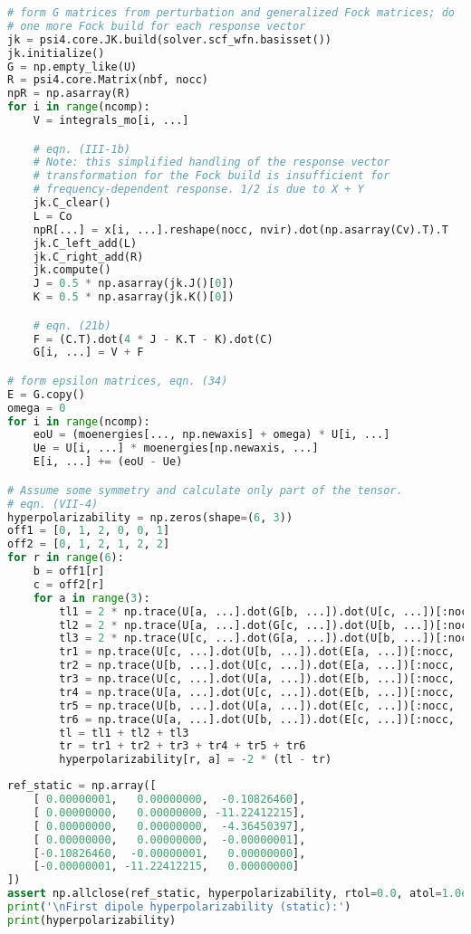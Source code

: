 \documentclass[]{article}
\begin{document}
\begin{lstlisting}[language=Python]
# form G matrices from perturbation and generalized Fock matrices; do
# one more Fock build for each response vector
jk = psi4.core.JK.build(solver.scf_wfn.basisset())
jk.initialize()
G = np.empty_like(U)
R = psi4.core.Matrix(nbf, nocc)
npR = np.asarray(R)
for i in range(ncomp):
    V = integrals_mo[i, ...]

    # eqn. (III-1b)
    # Note: this simplified handling of the response vector
    # transformation for the Fock build is insufficient for
    # frequency-dependent response. 1/2 is due to X + Y
    jk.C_clear()
    L = Co
    npR[...] = x[i, ...].reshape(nocc, nvir).dot(np.asarray(Cv).T).T
    jk.C_left_add(L)
    jk.C_right_add(R)
    jk.compute()
    J = 0.5 * np.asarray(jk.J()[0])
    K = 0.5 * np.asarray(jk.K()[0])

    # eqn. (21b)
    F = (C.T).dot(4 * J - K.T - K).dot(C)
    G[i, ...] = V + F

# form epsilon matrices, eqn. (34)
E = G.copy()
omega = 0
for i in range(ncomp):
    eoU = (moenergies[..., np.newaxis] + omega) * U[i, ...]
    Ue = U[i, ...] * moenergies[np.newaxis, ...]
    E[i, ...] += (eoU - Ue)

# Assume some symmetry and calculate only part of the tensor.
# eqn. (VII-4)
hyperpolarizability = np.zeros(shape=(6, 3))
off1 = [0, 1, 2, 0, 0, 1]
off2 = [0, 1, 2, 1, 2, 2]
for r in range(6):
    b = off1[r]
    c = off2[r]
    for a in range(3):
        tl1 = 2 * np.trace(U[a, ...].dot(G[b, ...]).dot(U[c, ...])[:nocc, :nocc])
        tl2 = 2 * np.trace(U[a, ...].dot(G[c, ...]).dot(U[b, ...])[:nocc, :nocc])
        tl3 = 2 * np.trace(U[c, ...].dot(G[a, ...]).dot(U[b, ...])[:nocc, :nocc])
        tr1 = np.trace(U[c, ...].dot(U[b, ...]).dot(E[a, ...])[:nocc, :nocc])
        tr2 = np.trace(U[b, ...].dot(U[c, ...]).dot(E[a, ...])[:nocc, :nocc])
        tr3 = np.trace(U[c, ...].dot(U[a, ...]).dot(E[b, ...])[:nocc, :nocc])
        tr4 = np.trace(U[a, ...].dot(U[c, ...]).dot(E[b, ...])[:nocc, :nocc])
        tr5 = np.trace(U[b, ...].dot(U[a, ...]).dot(E[c, ...])[:nocc, :nocc])
        tr6 = np.trace(U[a, ...].dot(U[b, ...]).dot(E[c, ...])[:nocc, :nocc])
        tl = tl1 + tl2 + tl3
        tr = tr1 + tr2 + tr3 + tr4 + tr5 + tr6
        hyperpolarizability[r, a] = -2 * (tl - tr)
\end{lstlisting}

\begin{lstlisting}[language=Python]
ref_static = np.array([
    [ 0.00000001,   0.00000000,  -0.10826460],
    [ 0.00000000,   0.00000000, -11.22412215],
    [ 0.00000000,   0.00000000,  -4.36450397],
    [ 0.00000000,   0.00000000,  -0.00000001],
    [-0.10826460,  -0.00000001,   0.00000000],
    [-0.00000001, -11.22412215,   0.00000000]
])
assert np.allclose(ref_static, hyperpolarizability, rtol=0.0, atol=1.0e-3)
print('\nFirst dipole hyperpolarizability (static):')
print(hyperpolarizability)
\end{lstlisting}
\end{document}
